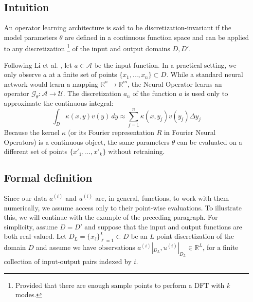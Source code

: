 \subsection{Intuition}

An operator learning architecture is said to be discretization-invariant if the model parameters $\theta$ are defined in a continuous function space and can be applied to any discretization \footnote{Provided that there are enough sample points to perform a DFT with $k$ modes.} %
 of the input and output domains $D, D'$. 

Following Li et al. \cite{li2020fourier}, let $a \in \mathcal{A}$ be the input function. In a practical setting, we only observe $a$ at a finite set of points $\{x_1, \dots, x_n\} \subset D$. While a standard neural network would learn a mapping $\mathbb{R}^n \to \mathbb{R}^m$, the Neural Operator learns an operator $\mathcal{G}_{\theta}: \mathcal{A} \to \mathcal{U}$. The discretization $a_n$ of the function $a$ is used only to approximate the continuous integral:
\[ 
\int_{D} \kappa(x,y) v(y) \, dy \approx \sum_{j=1}^{n} \kappa(x, y_j) v(y_j) \Delta y_j 
\]
Because the kernel $\kappa$ (or its Fourier representation $R$ in Fourier Neural Operators) is a continuous object, the same parameters $\theta$ can be evaluated on a different set of points $\{x'_1, \dots, x'_k\}$ without retraining.

\subsection{Formal definition}

Since our data $a^{(i)}$ and $u^{(i)}$ are, in general, functions, to work with them numerically, we assume access only to their point-wise evaluations. To illustrate this, we will continue with the example of the preceding paragraph. For simplicity, assume $D = D'$ and suppose that the input and output functions are both real-valued. Let $D_L = \{x_{\ell}\}_{\ell=1}^L \subset D$ be an $L$-point discretization of the domain $D$ and assume we have observations $a^{(i)}|_{D_L}, u^{(i)}|_{D_L} \in \mathbb{R}^L$, for a finite collection of input-output pairs indexed by $i$. 

